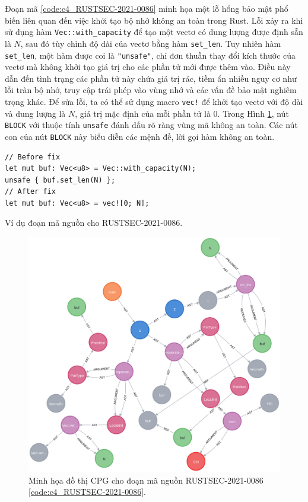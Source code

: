 Đoạn mã \ref{code:c4_RUSTSEC-2021-0086} minh họa một lỗ hổng bảo mật phổ biến liên quan đến việc khởi tạo bộ nhớ không an toàn trong Rust.
Lỗi xảy ra khi sử dụng hàm \texttt{Vec::with\_capacity} để tạo một vectơ có dung lượng được định sẵn là $N$, sau đó tùy chỉnh độ dài của vectơ bằng hàm \texttt{set\_len}.
Tuy nhiên hàm \texttt{set\_len}, một hàm được coi là \texttt{"unsafe"}, chỉ đơn thuần thay đổi kích thước của vectơ mà không khởi tạo giá trị cho các phần tử mới được thêm vào.
Điều này dẫn đến tình trạng các phần tử này chứa giá trị rác, tiềm ẩn nhiều nguy cơ như lỗi tràn bộ nhớ, truy cập trái phép vào vùng nhớ và các vấn đề bảo mật nghiêm trọng khác.
Để sửa lỗi, ta có thể sử dụng macro \texttt{vec!} để khởi tạo vectơ với độ dài và dung lượng là $N$, giá trị mặc định của mỗi phần tử là $0$.
Trong Hình \ref{img:c4_RUSTSEC-2021-0086}, nút \texttt{BLOCK} với thuộc tính \texttt{unsafe} đánh dấu rõ ràng vùng mã không an toàn.
Các nút con của nút \texttt{BLOCK} này biểu diễn các mệnh đề, lời gọi hàm không an toàn.

\begin{listing}[H]
\begin{verbatim}
// Before fix
let mut buf: Vec<u8> = Vec::with_capacity(N);
unsafe { buf.set_len(N) };
// After fix
let mut buf: Vec<u8> = vec![0; N];
\end{verbatim}
\caption{Ví dụ đoạn mã nguồn cho RUSTSEC-2021-0086.}
\label{code:c4_RUSTSEC-2021-0086}
\end{listing}

\begin{figure}[H]
    \includegraphics[width=1\columnwidth]{figures/c4/c4_RUSTSEC-2021-0086}
    \centering
    \caption{Minh họa đồ thị CPG cho đoạn mã nguồn RUSTSEC-2021-0086 \ref{code:c4_RUSTSEC-2021-0086}.}
    \label{img:c4_RUSTSEC-2021-0086}
\end{figure}

